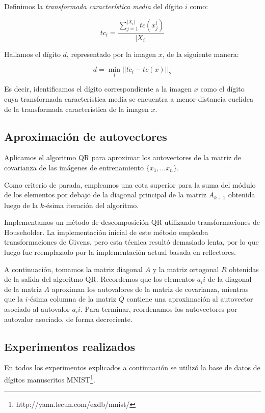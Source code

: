 \documentclass[a4paper,10pt,twoside]{article}
\begin{document}
Definimos la \textit{transformada característica media} del dígito $i$ como:

$$
tc_i = \frac{\sum_{j=1}^{|X_i|}{tc(x_j^i)}}
            {|X_i|}
$$

Hallamos el dígito $d$, representado por la imagen $x$, de la siguiente manera:

$$
d = \min_{i} || tc_i - tc(x) ||_2
$$

Es decir, identificamos el dígito correspondiente a la imagen $x$ como el dígito cuya transformada característica media se encuentra a menor distancia euclídea de la transformada característica de la imagen $x$.


\subsection{Aproximación de autovectores}

Aplicamos el algoritmo QR para aproximar los autovectores de la matriz de covarianza de las imágenes de entrenamiento $\{x_1, \ldots x_n\}$. 

Como criterio de parada, empleamos una cota superior para la suma del módulo de los elementos por debajo de la diagonal principal de la matriz $A_{k+1}$ obtenida luego de la $k$-ésima iteración del algoritmo.

Implementamos un método de descomposición QR utilizando transformaciones de Householder. La implementación inicial de este método empleaba transformaciones de Givens, pero esta técnica resultó demasiado lenta, por lo que luego fue reemplazado por la implementación actual basada en reflectores.

A continuación, tomamos la matriz diagonal $A$ y la matriz ortogonal $R$ obtenidas de la salida del algoritmo QR. Recordemos que los elementos $a_ii$ de la diagonal de la matriz $A$ aproximan los autovalores de la matriz de covarianza, mientras que la $i$-ésima columna de la matriz $Q$ contiene una aproximación al autovector asociado al autovalor $a_ii$. Para terminar, reordenamos los autovectores por autovalor asociado, de forma decreciente.


\subsection{Experimentos realizados}

En todos los experimentos explicados a continuación se utilizó la base de datos de dígitos manuscritos MNIST\footnote{http://yann.lecun.com/exdb/mnist/}.
\end{document}
